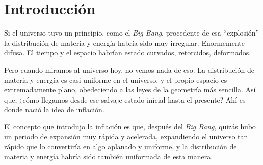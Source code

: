\chapter{Introducción}
Si el universo tuvo un principio, como el \textit{Big Bang}, procedente de esa ``explosión'' la distribución de materia y energía habría sido muy irregular. Enormemente difusa. El tiempo y el espacio habrían estado curvados, retorcidos, deformados.

Pero cuando miramos al universo hoy, no vemos nada de eso. La distribución de materia y energía es casi uniforme en el universo, y el propio espacio es extremadamente plano, obedeciendo a las leyes de la geometría más sencilla. Así que, ¿cómo llegamos desde ese salvaje estado inicial hasta el presente? Ahí es donde nació la idea de inflación.

El concepto que introdujo la inflación es que, después del \textit{Big Bang}, quizás hubo un periodo de expansión muy rápida y acelerada, expandiendo el universo tan rápido que lo convertiría en algo aplanado y uniforme, y la distribución de materia y energía habría sido también uniformada de esta manera.

